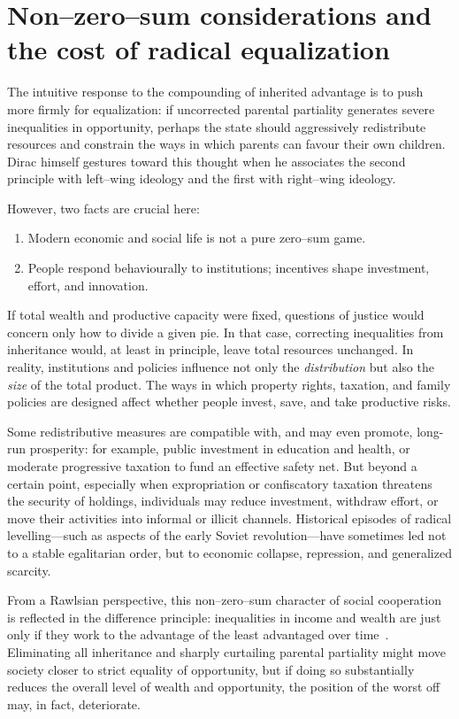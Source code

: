 \documentclass[%
  reprint,
  superscriptaddress,
  amsmath,amssymb,
  pra,
  floatfix,
  longbibliography
]{revtex4-2}
\begin{document}
\section{Non--zero--sum considerations and the cost of radical equalization}

The intuitive response to the compounding of inherited advantage is to
push more firmly for equalization: if uncorrected parental partiality
generates severe inequalities in opportunity, perhaps the state should
aggressively redistribute resources and constrain the ways in which
parents can favour their own children.  Dirac himself gestures toward
this thought when he associates the second principle with left--wing
ideology and the first with right--wing ideology.

However, two facts are crucial here:

\begin{enumerate}
  \item Modern economic and social life is not a pure zero--sum game.
  \item People respond behaviourally to institutions; incentives shape
  investment, effort, and innovation.
\end{enumerate}

If total wealth and productive capacity were fixed, questions of justice
would concern only how to divide a given pie.  In that case, correcting
inequalities from inheritance would, at least in principle, leave total
resources unchanged.  In reality, institutions and policies influence
not only the \emph{distribution} but also the \emph{size} of the total
product.  The ways in which property rights, taxation, and family
policies are designed affect whether people invest, save, and take
productive risks.

Some redistributive measures are compatible with, and may even promote,
long-run prosperity: for example, public investment in education and
health, or moderate progressive taxation to fund an effective safety
net.  But beyond a certain point, especially when expropriation or
confiscatory taxation threatens the security of holdings, individuals
may reduce investment, withdraw effort, or move their activities into
informal or illicit channels.  Historical episodes of radical
levelling---such as aspects of the early Soviet revolution---have
sometimes led not to a stable egalitarian order, but to economic
collapse, repression, and generalized scarcity.

From a Rawlsian perspective, this non--zero--sum character of social
cooperation is reflected in the difference principle: inequalities in
income and wealth are just only if they work to the advantage of the
least advantaged over time~\cite{Rawls1999}.  Eliminating all
inheritance and sharply curtailing parental partiality might move
society closer to strict equality of opportunity, but if doing so
substantially reduces the overall level of wealth and opportunity, the
position of the worst off may, in fact, deteriorate.
\end{document}
